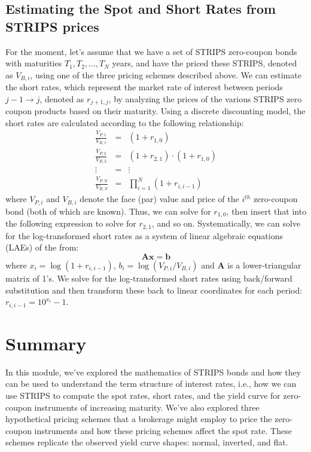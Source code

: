 \documentclass[11pt]{article}
\theoremstyle{definition}
\begin{document}
\subsection*{Estimating the Spot and Short Rates from STRIPS prices}
For the moment, let's assume that we have a set of STRIPS zero-coupon bonds with maturities $T_{1}, T_{2},\ldots, T_{N}$ years, 
and have the priced these STRIPS, denoted as $V_{B, i}$, using one of the three pricing schemes described above.
We can estimate the short rates, which represent the market rate of interest between periods $j-1\rightarrow{j}$, denoted as $r_{j+1,j}$, by analyzing the prices of the various STRIPS zero coupon products based on their maturity. Using a discrete discounting model, the short rates are calculated according to the following relationship:
\begin{eqnarray}
\frac{V_{P,1}}{V_{B,1}} & = & \left(1+r_{1,0}\right) \\
\frac{V_{P,2}}{V_{B,2}} & = & \left(1+r_{2,1}\right)\cdot\left(1+r_{1,0}\right) \\
\vdots & = & \vdots \\
\frac{V_{P,N}}{V_{B,N}} & = & \prod_{i=1}^{N}\left(1+r_{i,i-1}\right)
\end{eqnarray}
where $V_{P, i}$ and $V_{B, i}$ denote the face (par) value and price of the $i^{th}$ zero-coupon bond (both of which are known). Thus, we can solve for $r_{1,0}$, then insert that into the following expression to solve for $r_{2,1}$, and so on. Systematically, we can solve for the log-transformed short rates as a system of linear algebraic equations (LAEs) of the from:
\begin{equation}
\mathbf{A}\mathbf{x} = \mathbf{b}
\end{equation}
where $x_{i} = \log\left(1+r_{i,i-1}\right)$, $b_{i} = \log\left(V_{P,i}/V_{B,i}\right)$ and $\mathbf{A}$ is a lower-triangular matrix of 1's. We solve for the log-transformed short rates using back/forward substitution
and then transform these back to linear coordinates for each period: $r_{i,i-1} = 10^{x_{i}} - 1$.

\section*{Summary}
In this module, we've explored the mathematics of STRIPS bonds and how they can be used to understand the term structure of interest rates, i.e., how we can use STRIPS to compute the spot rates, short rates, and the yield curve for zero-coupon instruments of increasing maturity. We've also explored three hypothetical pricing schemes that a brokerage might employ to price the zero-coupon instruments and how these pricing schemes affect the spot rate. These schemes replicate the observed yield curve shapes: normal, inverted, and flat. 
\end{document}
